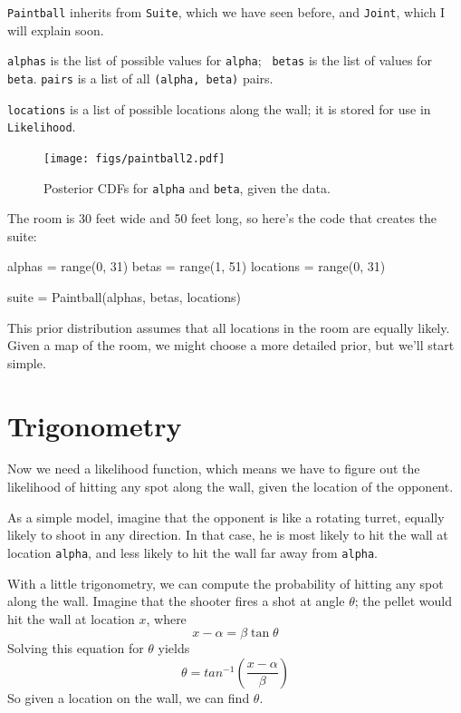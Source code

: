 \documentclass[12pt]{book}
\theoremstyle{exercise}
\begin{document}
{\tt Paintball} inherits from {\tt Suite}, which we have seen before,
and {\tt Joint}, which I will explain soon.

{\tt alphas} is the list of possible values for {\tt alpha}; {\tt
  betas} is the list of values for {\tt beta}.  {\tt pairs} is a list
of all {\tt (alpha, beta)} pairs.

{\tt locations} is a list of possible locations along
the wall; it is stored for use in {\tt Likelihood}.

\begin{figure}
\centerline{\texttt{[image: figs/paintball2.pdf]}}
\caption{Posterior CDFs for {\tt alpha} and {\tt beta}, given the data.}
\label{fig.paintball2}
\end{figure}

The room is 30 feet wide and 50 feet long, so here's the code that
creates the suite:

\begin{code}
    alphas = range(0, 31)
    betas = range(1, 51)
    locations = range(0, 31)

    suite = Paintball(alphas, betas, locations)
\end{code}

This prior distribution assumes that all locations in the room are
equally likely.  Given a map of the room, we might choose a more
detailed prior, but we'll start simple.


\section{Trigonometry}

Now we need a likelihood function, which means we have to figure
out the likelihood of hitting any spot along the wall, given
the location of the opponent.

As a simple model, imagine that the opponent is like a rotating
turret, equally likely to shoot in any direction.
In that case, he is most likely to hit
the wall at location {\tt alpha}, and less likely to hit the wall far
away from {\tt alpha}.

With a little trigonometry, we can compute the probability of hitting
any spot along the wall.  Imagine that the shooter fires a shot at
angle $\theta$; the pellet would hit the wall at location $x$, where
%
\[ x - \alpha = \beta \tan \theta \]
%
Solving this equation for $\theta$ yields
%
\[ \theta = tan^{-1} \left( \frac{x - \alpha}{\beta} \right) \]
%
So given a location on the wall, we can find $\theta$.
\end{document}

